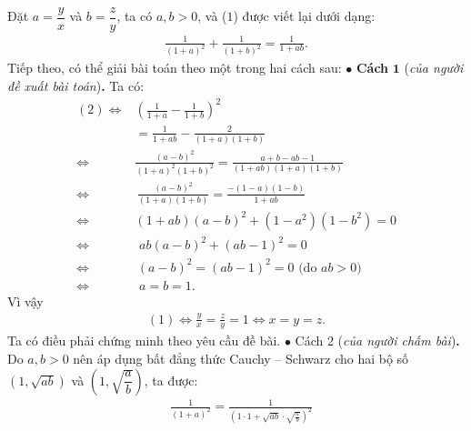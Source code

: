 \begin{multicols}{2}
	Đặt $a = \dfrac{y}{x}$  và  $b = \dfrac{z}{y}$, ta có $a, b > 0$, và ($1$) được viết lại dưới dạng:
	\begin{align*}
		\frac{1}{{{{\left( {1 + a} \right)}^2}}} + \frac{1}{{{{\left( {1 + b} \right)}^2}}} = \frac{1}{{1 + ab}}.\tag{$2$}
	\end{align*}
	Tiếp theo, có thể giải bài toán theo một trong hai cách sau:
	\vskip 0.05cm
	\columnbreak
	$\bullet$ \textbf{\color{thachthuctoanhoc}Cách} $\pmb{1}$ (\textit{của người đề xuất bài toán})\textbf{\color{thachthuctoanhoc}.}
	\vskip 0.05cm
	Ta có:
	\begin{align*}
		(2)\!\Leftrightarrow &{\left( {\frac{1}{{1 + a}} - \frac{1}{{1 + b}}} \right)^2} \\[-0.4ex]
		&= \frac{1}{{1 + ab}} - \frac{2}{{\left( {1 + a} \right)\left( {1 + b} \right)}}\\[-0.4ex]
		\Leftrightarrow &\frac{{{{\left( {a - b} \right)}^2}}}{{{{\left(\!{1 \!+\! a}\! \right)}^2}\!{{\left( \!{1 + b}\! \right)}^2}}} \!=\! \frac{{a + b - ab - 1}}{{\left(\! {1 \!+\! ab}\! \right)\!\left(\! {1 \!+\! a}\! \right)\!\left(\! {1 + b}\! \right)}}\\[-0.4ex]
		\Leftrightarrow&\, \frac{{{{\left( {a - b} \right)}^2}}}{{\left( {1 + a} \right)\left( {1 + b} \right)}}= \frac{{ - \left( {1 - a} \right)\left( {1 - b} \right)}}{{1 + ab}}\\[-0.4ex]
		\Leftrightarrow &\left( {1 \!+\! ab} \right)\!{\left( {a \!-\! b} \right)^2} \!+\! \left(\!\! {1 \!-\! {a^2}} \right)\!\!\left(\!\! {1 \!-\! {b^2}} \right) \!=\! 0\\[-0.4ex]
		\Leftrightarrow &\,\,ab{\left( {a - b} \right)^2} + {\left( {ab - 1} \right)^2} = 0\\[-0.4ex]
		\Leftrightarrow &\,{\left( {a - b} \right)^2} = {\left( {ab - 1} \right)^2} = 0 \text{ (do $ab>0$)}\\[-0.4ex]
		\Leftrightarrow &\,\,a = b = 1.
	\end{align*} 
	Vì vậy
	\begin{align*}
		(1) \Leftrightarrow \frac{y}{x} = \frac{z}{y} = 1 \Leftrightarrow x = y =z.
	\end{align*}
	Ta có điều phải chứng minh theo yêu cầu đề bài.
	\vskip 0.05cm
	$\bullet$ Cách $2$ (\textit{của người chấm bài})\textbf{\color{thachthuctoanhoc}.}
	\vskip 0.05cm
	Do $a, b > 0$ nên áp dụng bất đẳng thức Cauchy -- Schwarz cho hai bộ số  $(1,\sqrt{ab})$ và  $\left(1, \sqrt{\dfrac{a}{b}}\right)$, ta được:
	\begin{align*}
		&\frac{1}{{{{\left( {1 + a} \right)}^2}}} = \frac{1}{{{{\left( {1 \cdot 1 + \sqrt {ab}  \cdot \sqrt {\frac{a}{b}} } \right)}^2}}} \\[-0.4ex]

\end{align*}
\end{multicols}
